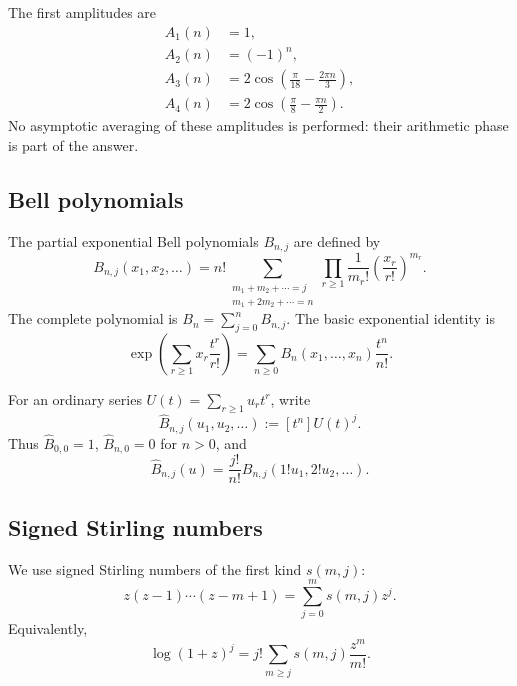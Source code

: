 \documentclass[11pt,a4paper]{article}
\numberwithin{equation}{section}
\theoremstyle{definition}
\theoremstyle{remark}
\newcommand{\Bhat}{\widehat{B}}
\begin{document}
The first amplitudes are
\begin{align}
 A_1(n)&=1,\nonumber\\
 A_2(n)&=(-1)^n,\nonumber\\
 A_3(n)&=2\cos\!\left(\frac{\pi}{18}-\frac{2\pi n}{3}\right),
 \label{eq:first-amplitudes}\\
 A_4(n)&=2\cos\!\left(\frac{\pi}{8}-\frac{\pi n}{2}\right).
 \nonumber
\end{align}
No asymptotic averaging of these amplitudes is performed: their arithmetic
phase is part of the answer.

\subsection{Bell polynomials}

The partial exponential Bell polynomials $B_{n,j}$ are defined by
\begin{equation}\label{eq:exp-bell-def}
 B_{n,j}(x_1,x_2,\ldots)=
 n!\!\sum_{\substack{m_1+m_2+\cdots=j\\
                     m_1+2m_2+\cdots=n}}
 \prod_{r\geq1}\frac1{m_r!}
 \left(\frac{x_r}{r!}\right)^{m_r}.
\end{equation}
The complete polynomial is $B_n=\sum_{j=0}^nB_{n,j}$.  The basic exponential
identity is
\begin{equation}\label{eq:bell-exp}
 \exp\!\left(\sum_{r\geq1}x_r\frac{t^r}{r!}\right)
 =\sum_{n\geq0}B_n(x_1,\ldots,x_n)\frac{t^n}{n!}.
\end{equation}

For an ordinary series $U(t)=\sum_{r\geq1}u_rt^r$, write
\begin{equation}\label{eq:ordinary-bell}
 \Bhat_{n,j}(u_1,u_2,\ldots):=[t^n]U(t)^j.
\end{equation}
Thus $\Bhat_{0,0}=1$, $\Bhat_{n,0}=0$ for $n>0$, and
\begin{equation}\label{eq:ordinary-exp-scaling}
 \Bhat_{n,j}(u)=\frac{j!}{n!}
 B_{n,j}(1!u_1,2!u_2,\ldots).
\end{equation}

\subsection{Signed Stirling numbers}

We use signed Stirling numbers of the first kind $s(m,j)$:
\begin{equation}\label{eq:stirling-def}
 z(z-1)\cdots(z-m+1)=\sum_{j=0}^m s(m,j)z^j.
\end{equation}
Equivalently,
\begin{equation}\label{eq:log-stirling}
 \log(1+z)^j=j!\sum_{m\geq j}s(m,j)\frac{z^m}{m!}.
\end{equation}
\end{document}
